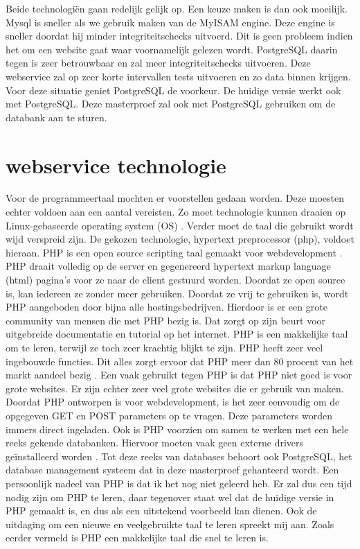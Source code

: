 \npar
Beide technologi\"en gaan redelijk gelijk op. Een keuze maken is dan ook moeilijk. 
Mysql is sneller als we gebruik maken van de MyISAM engine. Deze engine is sneller doordat hij minder integriteitschecks uitvoerd. Dit is geen probleem indien het om een website gaat waar voornamelijk gelezen wordt. PostgreSQL daarin tegen is zeer betrouwbaar en zal meer integriteitschecks uitvoeren. Deze webservice zal op zeer korte intervallen tests uitvoeren en zo data binnen krijgen. Voor deze situatie geniet PostgreSQL de voorkeur. De huidige versie werkt ook met PostgreSQL. Deze masterproef zal ook met PostgreSQL gebruiken om de databank aan te sturen.
 
\section{webservice technologie}
\npar
Voor de programmeertaal mochten er voorstellen gedaan worden. Deze moesten echter voldoen aan een aantal vereisten. Zo moet technologie kunnen draaien op Linux-gebaseerde operating system (OS) . Verder moet de taal die gebruikt wordt wijd verspreid zijn.
\npar
De gekozen technologie, hypertext preprocessor (php), voldoet hieraan. PHP is een open source scripting taal gemaakt voor webdevelopment \citep{php-what}. PHP draait volledig op de server en gegenereerd hypertext markup language (html)  pagina's voor ze naar de client gestuurd worden. Doordat ze open source is, kan iedereen ze zonder meer gebruiken. Doordat ze vrij te gebruiken is, wordt PHP aangeboden door bijna alle hostingsbedrijven. Hierdoor is er een grote community van mensen die met PHP bezig is. Dat zorgt op zijn beurt voor uitgebreide documentatie en tutorial op het internet. PHP is een makkelijke taal om te leren, terwijl ze toch zeer krachtig blijkt te zijn. PHP heeft zeer veel ingebouwde functies. Dit alles zorgt ervoor dat PHP meer dan 80 procent van het markt aandeel bezig \citep{php-market}. Een vaak gebruikt tegen PHP is dat PHP niet goed is voor grote websites. Er zijn echter zeer veel grote websites die er gebruik van maken\citep{php-big-sites}.
\npar
Doordat PHP ontworpen is voor webdevelopment, is het zeer eenvoudig om de opgegeven GET en POST parameters op te vragen. Deze parameters worden immers direct ingeladen. Ook is PHP voorzien om samen te werken met een hele reeks gekende databanken. Hiervoor moeten vaak geen externe drivers ge\"installeerd worden \citep{php-databases}. Tot deze reeks van databases behoort ook PostgreSQL, het database management systeem dat in deze masterproef gehanteerd wordt. 
\npar
Een persoonlijk nadeel van PHP is dat ik het nog niet geleerd heb. Er zal dus een tijd nodig zijn om PHP te leren, daar tegenover staat wel dat de huidige versie in PHP gemaakt is, en dus als een uitstekend voorbeeld kan dienen. Ook de uitdaging om een nieuwe en veelgebruikte taal te leren spreekt mij aan.
Zoals eerder vermeld is PHP een makkelijke taal die snel te leren is.
